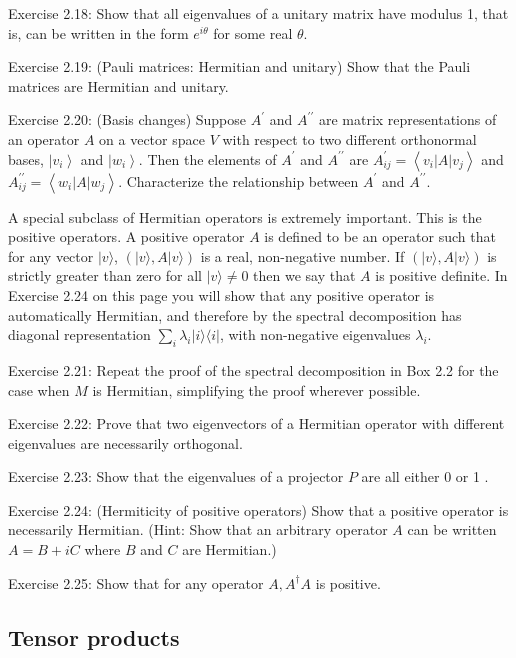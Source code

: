 \documentclass[
	11pt, %
	fleqn, %
	a4paper, %
]{LegrandOrangeBook}
\begin{document}
Exercise 2.18: Show that all eigenvalues of a unitary matrix have modulus 1, that is, can be written in the form $e^{i \theta}$ for some real $\theta$.

Exercise 2.19: (Pauli matrices: Hermitian and unitary) Show that the Pauli matrices are Hermitian and unitary.

Exercise 2.20: (Basis changes) Suppose $A^{\prime}$ and $A^{\prime \prime}$ are matrix representations of an operator $A$ on a vector space $V$ with respect to two different orthonormal bases, $\left|v_{i}\right\rangle$ and $\left|w_{i}\right\rangle$. Then the elements of $A^{\prime}$ and $A^{\prime \prime}$ are $A_{i j}^{\prime}=\left\langle v_{i}|A| v_{j}\right\rangle$ and $A_{i j}^{\prime \prime}=\left\langle w_{i}|A| w_{j}\right\rangle$. Characterize the relationship between $A^{\prime}$ and $A^{\prime \prime}$.

A special subclass of Hermitian operators is extremely important. This is the positive operators. A positive operator $A$ is defined to be an operator such that for any vector $|v\rangle$, $(|v\rangle, A|v\rangle)$ is a real, non-negative number. If $(|v\rangle, A|v\rangle)$ is strictly greater than zero for all $|v\rangle \neq 0$ then we say that $A$ is positive definite. In Exercise 2.24 on this page you will show that any positive operator is automatically Hermitian, and therefore by the spectral decomposition has diagonal representation $\sum_{i} \lambda_{i}|i\rangle\langle i|$, with non-negative eigenvalues $\lambda_{i}$.

Exercise 2.21: Repeat the proof of the spectral decomposition in Box 2.2 for the case when $M$ is Hermitian, simplifying the proof wherever possible.

Exercise 2.22: Prove that two eigenvectors of a Hermitian operator with different eigenvalues are necessarily orthogonal.

Exercise 2.23: Show that the eigenvalues of a projector $P$ are all either 0 or 1 .

Exercise 2.24: (Hermiticity of positive operators) Show that a positive operator is necessarily Hermitian. (Hint: Show that an arbitrary operator $A$ can be written $A=B+i C$ where $B$ and $C$ are Hermitian.)

Exercise 2.25: Show that for any operator $A, A^{\dagger} A$ is positive.

\subsection{Tensor products}
\end{document}
